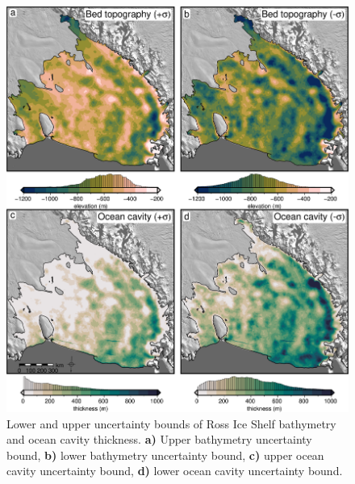 \begin{figure}[!ht]
    \centering
    \includegraphics[width=.8\textwidth]{figures/chp5/uncertainty_limits.png}
    \caption[Uncertainty bounds for Ross Ice Shelf bathymetry and ocean cavity]{Lower and upper uncertainty bounds of Ross Ice Shelf bathymetry and ocean cavity thickness. \textbf{a)} Upper bathymetry uncertainty bound, \textbf{b)} lower bathymetry uncertainty bound, \textbf{c)} upper ocean cavity uncertainty bound, \textbf{d)} lower ocean cavity uncertainty bound.}
    \label{fig:chp5_uncertainty_limits}
\end{figure}


